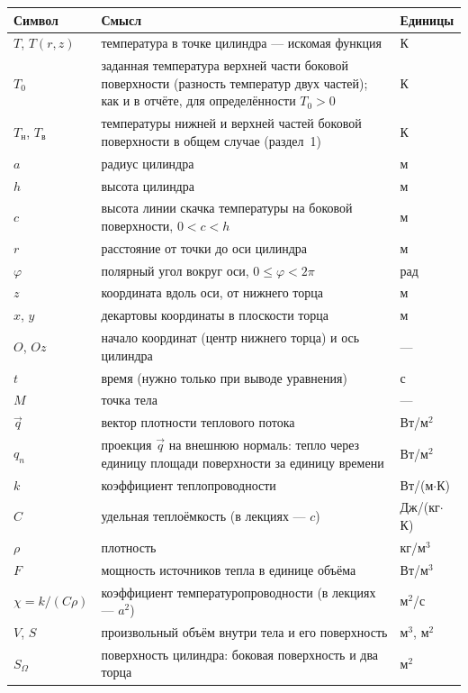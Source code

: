 \documentclass[a4paper,12pt]{article}
\renewcommand{\le}{\leqslant}
\begin{document}
\begin{longtable}{@{}>{\raggedright\arraybackslash}p{2.6cm}>{\raggedright\arraybackslash}p{9.6cm}>{\raggedright\arraybackslash}p{3.6cm}@{}}
\toprule
Символ & Смысл & Единицы \\
\midrule
\endhead
$T$, $T(r,z)$ & температура в точке цилиндра — искомая функция & К \\
$T_0$ & заданная температура верхней части боковой поверхности (разность температур двух частей); как и в отчёте, для определённости $T_0>0$ & К \\
$T_{\text{н}}$, $T_{\text{в}}$ & температуры нижней и верхней частей боковой поверхности в общем случае (раздел~1) & К \\
$a$ & радиус цилиндра & м \\
$h$ & высота цилиндра & м \\
$c$ & высота линии скачка температуры на боковой поверхности, $0<c<h$ & м \\
$r$ & расстояние от точки до оси цилиндра & м \\
$\varphi$ & полярный угол вокруг оси, $0\le\varphi<2\pi$ & рад \\
$z$ & координата вдоль оси, от нижнего торца & м \\
$x$, $y$ & декартовы координаты в плоскости торца & м \\
$O$, $Oz$ & начало координат (центр нижнего торца) и ось цилиндра & — \\
$t$ & время (нужно только при выводе уравнения) & с \\
$M$ & точка тела & — \\
$\vec q$ & вектор плотности теплового потока & Вт/м$^2$ \\
$q_n$ & проекция $\vec q$ на внешнюю нормаль: тепло через единицу площади поверхности за единицу времени & Вт/м$^2$ \\
$k$ & коэффициент теплопроводности & Вт/(м$\cdot$К) \\
$C$ & удельная теплоёмкость (в лекциях — $c$) & Дж/(кг$\cdot$К) \\
$\rho$ & плотность & кг/м$^3$ \\
$F$ & мощность источников тепла в единице объёма & Вт/м$^3$ \\
$\chi=k/(C\rho)$ & коэффициент температуропроводности (в лекциях — $a^2$) & м$^2$/с \\
$V$, $S$ & произвольный объём внутри тела и его поверхность & м$^3$, м$^2$ \\
$S_\Omega$ & поверхность цилиндра: боковая поверхность и два торца & м$^2$ \\

\end{longtable}
\end{document}

